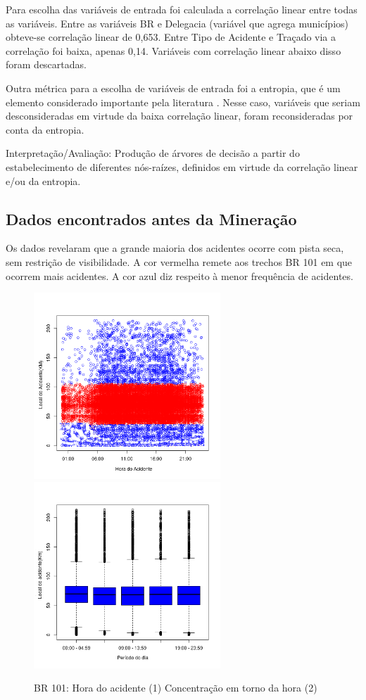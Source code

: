Para escolha das variáveis de entrada foi calculada a correlação linear entre todas as variáveis. Entre as variáveis BR e
Delegacia (variável que agrega municípios) obteve-se correlação linear de 0,653. Entre Tipo de Acidente e Traçado via a
correlação foi baixa, apenas 0,14. Variáveis com correlação linear abaixo disso foram descartadas. 

Outra métrica para a escolha de variáveis de entrada foi a entropia, que é um elemento considerado importante pela literatura \cite{NorvigRussel2004}. Nesse caso, variáveis que seriam desconsideradas em virtude da baixa correlação linear, foram reconsideradas por conta da entropia.

Interpretação/Avaliação: Produção de árvores de decisão a
partir do estabelecimento de diferentes nós-raízes, definidos em
virtude da correlação linear e/ou da entropia.

\pagebreak

\subsection{Dados encontrados antes da Mineração}

Os dados revelaram que a grande maioria dos acidentes ocorre com pista seca, sem restrição de visibilidade. 
A cor vermelha remete aos trechos BR 101 em que ocorrem mais acidentes. A cor azul diz respeito à menor frequência de acidentes.

\begin{figure}[h]
	\caption{BR 101: Hora do acidente (1) Concentração em torno da hora (2)}
	\includegraphics[width=7cm,height=7cm]{Figuras/Preprocess/br101.png}
	\includegraphics[width=7cm,height=7cm]{Figuras/Preprocess/br101_2.png}
	
\end{figure}

